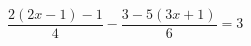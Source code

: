 \begin{ex}[type=equation]
	\begin{condition}
		$\dfrac{2(2x - 1)-1}{4}-\dfrac{3-5(3x + 1)}{6} = 3$
	\end{condition}
\end{ex}